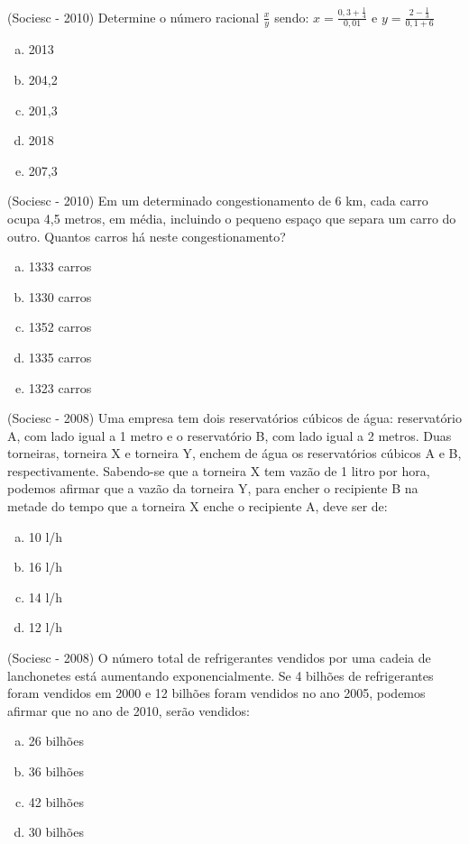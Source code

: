  \begin{exer}
 (Sociesc - 2010) Determine o número racional $\frac{x}{y}$ sendo:
  $x=\frac{0,3 + \frac{1}{4}}{0,01}$ e $y=\frac{2-\frac{1}{3}}{0,1+6}$
  \begin{enumerate}[a)]
  \item 2013
  \item 204,2
  \item 201,3
  \item 2018
  \item 207,3
 \end{enumerate}
 \end{exer}

 \begin{exer}
 (Sociesc - 2010) Em um determinado congestionamento de 6 km, cada carro ocupa 4,5 metros, em média, incluindo o pequeno espaço que separa um carro do outro. Quantos carros há neste congestionamento?
  \begin{enumerate}[a)]
  \item 1333 carros
  \item 1330 carros
  \item 1352 carros
  \item 1335 carros
  \item 1323 carros
 \end{enumerate}
 \end{exer}

 \begin{exer}
 (Sociesc - 2008) Uma empresa tem dois reservatórios cúbicos de água: reservatório A, com lado igual a 1 metro e o reservatório B, com lado igual a 2 metros. Duas torneiras, torneira X e torneira Y, enchem de água os reservatórios cúbicos A e B, respectivamente. Sabendo-se que a torneira X tem vazão de 1 litro por hora, podemos afirmar que a vazão da torneira Y, para encher o recipiente B na metade do tempo que a torneira X enche o recipiente A, deve ser de:
  \begin{enumerate}[a)]
  \item 10 l/h
  \item 16 l/h
  \item 14 l/h
  \item 12 l/h
 \end{enumerate}
 \end{exer}

 \begin{exer}
 (Sociesc - 2008) O número total de refrigerantes vendidos por uma cadeia de lanchonetes está aumentando exponencialmente. Se 4 bilhões de refrigerantes foram vendidos em 2000 e 12 bilhões foram vendidos no ano 2005, podemos afirmar que no ano de 2010, serão vendidos:
  \begin{enumerate}[a)]
  \item 26 bilhões
  \item 36 bilhões
  \item 42 bilhões
  \item 30 bilhões
 \end{enumerate}
 \end{exer}


